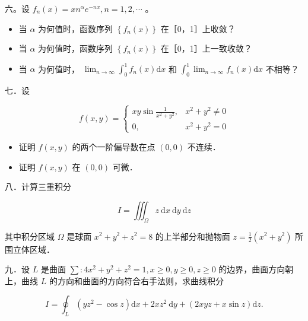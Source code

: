 \documentclass{article}
\begin{document}
六。设 \(f_{n}(x)=x n^{\alpha} e^{-n x}, n=1,2, \cdots\) 。

\begin{itemize}

  \item[1．] 当 \(\alpha\) 为何值时，函数序列 \(\left\{f_{n}(x)\right\}\) 在［0，1］上收敛？

  \item[2．] 当 \(\alpha\) 为何值时，函数序列 \(\left\{f_{n}(x)\right\}\) 在［0，1］上一致收敛？

  \item[3．] 当 \(\alpha\) 为何值时， \(\lim _{n \rightarrow \infty} \int_{0}^{1} f_{n}(x) \mathrm{d} x\) 和 \(\int_{0}^{1} \lim _{n \rightarrow \infty} f_{n}(x) \mathrm{d} x\) 不相等？
\end{itemize}

七．设

\[
f(x, y)= \begin{cases}x y \sin \frac{1}{x^{2}+y^{2}}, & x^{2}+y^{2} \neq 0 \\ 0, & x^{2}+y^{2}=0\end{cases}
\]

\begin{itemize}

  \item[1．] 证明 \(f(x, y)\) 的两个一阶偏导数在点 \((0,0)\) 不连续．

  \item[2．] 证明 \(f(x, y)\) 在 \((0,0)\) 可微．
\end{itemize}

八．计算三重积分

\[
I=\iiint_{\Omega} z \mathrm{~d} x \mathrm{~d} y \mathrm{~d} z
\]

其中积分区域 \(\Omega\) 是球面 \(x^{2}+y^{2}+z^{2}=8\) 的上半部分和抛物面 \(z=\frac{1}{2}\left(x^{2}+y^{2}\right)\) 所围立体区域．

九．设 \(L\) 是曲面 \(\sum: 4 x^{2}+y^{2}+z^{2}=1, x \geq 0, y \geq 0, z \geq 0\) 的边界，曲面方向朝上，曲线 \(L\) 的方向和曲面的方向符合右手法则，求曲线积分

\[
I=\oint_{L}\left(y z^{2}-\cos z\right) \mathrm{d} x+2 x z^{2} \mathrm{~d} y+(2 x y z+x \sin z) \mathrm{d} z .
\]
\end{document}
